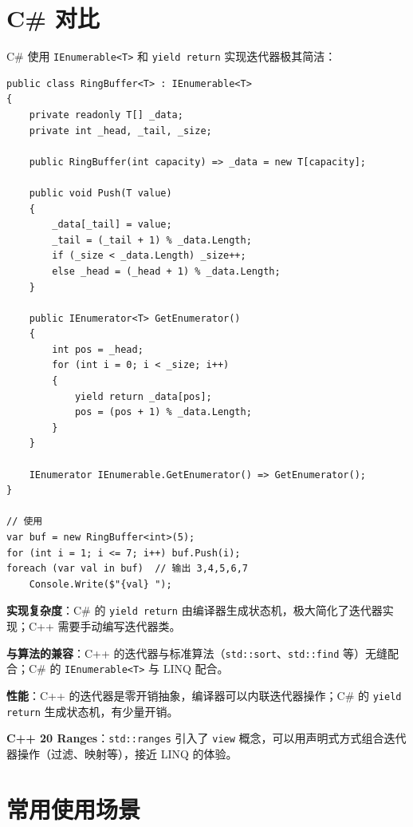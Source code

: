 \documentclass[12pt,a4paper,fontset=fandol]{ctexbook}
\begin{document}
\section{C\# 对比}

C\# 使用 \texttt{IEnumerable<T>} 和 \texttt{yield return} 实现迭代器极其简洁：

\begin{lstlisting}[style=csharpstyle, caption={C\# 迭代器 --- yield return}]
public class RingBuffer<T> : IEnumerable<T>
{
    private readonly T[] _data;
    private int _head, _tail, _size;

    public RingBuffer(int capacity) => _data = new T[capacity];

    public void Push(T value)
    {
        _data[_tail] = value;
        _tail = (_tail + 1) % _data.Length;
        if (_size < _data.Length) _size++;
        else _head = (_head + 1) % _data.Length;
    }

    public IEnumerator<T> GetEnumerator()
    {
        int pos = _head;
        for (int i = 0; i < _size; i++)
        {
            yield return _data[pos];
            pos = (pos + 1) % _data.Length;
        }
    }

    IEnumerator IEnumerable.GetEnumerator() => GetEnumerator();
}

// 使用
var buf = new RingBuffer<int>(5);
for (int i = 1; i <= 7; i++) buf.Push(i);
foreach (var val in buf)  // 输出 3,4,5,6,7
    Console.Write($"{val} ");
\end{lstlisting}

\begin{compare}
\textbf{实现复杂度}：C\# 的 \texttt{yield return} 由编译器生成状态机，极大简化了迭代器实现；C++ 需要手动编写迭代器类。

\textbf{与算法的兼容}：C++ 的迭代器与标准算法（\texttt{std::sort}、\texttt{std::find} 等）无缝配合；C\# 的 \texttt{IEnumerable<T>} 与 LINQ 配合。

\textbf{性能}：C++ 的迭代器是零开销抽象，编译器可以内联迭代器操作；C\# 的 \texttt{yield return} 生成状态机，有少量开销。

\textbf{C++ 20 Ranges}：\texttt{std::ranges} 引入了 \texttt{view} 概念，可以用声明式方式组合迭代器操作（过滤、映射等），接近 LINQ 的体验。
\end{compare}

\section{常用使用场景}
\end{document}
